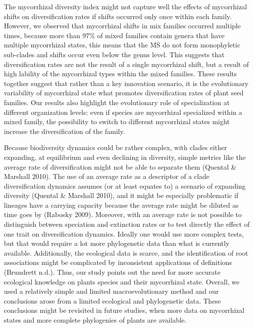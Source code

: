 \documentclass[12pt,]{article}
\begin{document}
The mycorrhizal diversity index might not capture well the effects of
mycorrhizal shifts on diversification rates if shifts occurred only once
within each family. However, we observed that mycorrhizal shifts in mix
families occurred multiple times, because more than 97\% of mixed
families contain genera that have multiple mycorrhizal states, this
means that the MS do not form monophyletic sub-clades and shifts occur
even below the genus level. This suggests that diversification rates are
not the result of a single mycorrhizal shift, but a result of high
lability of the mycorrhizal types within the mixed families. These
results together suggest that rather than a key innovation scenario, it
is the evolutionary variability of mycorrhizal state what promotes
diversification rates of plant seed families. Our results also highlight
the evolutionary role of specialization at different organization
levels: even if species are mycorrhizal specialized within a mixed
family, the possibility to switch to different mycorrhizal states might
increase the diversification of the family.

Because biodiversity dynamics could be rather complex, with clades
either expanding, at equilibrium and even declining in diversity, simple
metrics like the average rate of diversification might not be able to
separate them (Quental \& Marshall 2010). The use of an average rate as
a descriptor of a clade diversification dynamics assumes (or at least
equates to) a scenario of expanding diversity (Quental \& Marshall
2010), and it might be especially problematic if lineages have a
carrying capacity because the average rate might be diluted as time goes
by (Rabosky 2009). Moreover, with an average rate is not possible to
distinguish between speciation and extinction rates or to test directly
the effect of one trait on diversification dynamics. Ideally one would
use more complex tests, but that would require a lot more phylogenetic
data than what is currently available. Additionally, the ecological data
is scarce, and the identification of root associations might be
complicated by inconsistent applications of definitions (Brundrett
n.d.). Thus, our study points out the need for more accurate ecological
knowledge on plants species and their mycorrhizal state. Overall, we
used a relatively simple and limited macroevolutionary method and our
conclusions arose from a limited ecological and phylogenetic data. These
conclusions might be revisited in future studies, when more data on
mycorrhizal states and more complete phylogenies of plants are
available.
\end{document}
